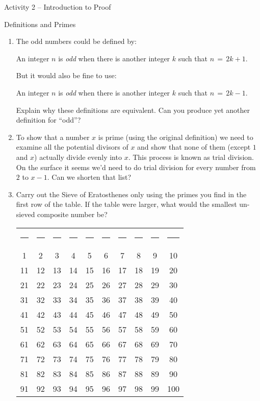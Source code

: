\documentclass{amsart}
\begin{document}
\thispagestyle{empty}

\centerline{\Large Activity 2 -- Introduction to Proof}
\centerline{\large Definitions and Primes}

\bigskip
\Large


\begin{enumerate}
\item The odd numbers could be defined by:

An integer $n$ is {\em odd} when there is another integer $k$ such that $n \, = \, 2k+1$.

But it would also be fine to use:

An integer $n$ is {\em odd} when there is another integer $k$ such that $n \, = \, 2k-1$.

Explain why these definitions are equivalent.  Can you produce yet another definition for ``odd''?

\vfill

\item To show that a number $x$ is prime (using the original definition) we need to examine all the potential divisors of $x$ and show that none of them (except $1$ and $x$) actually divide evenly into $x$.  This process is known as trial division.  On the surface it seems we'd need to do trial division for every number from $2$ to $x-1$.  Can we shorten that list?

\vfill 

\newpage

\item Carry out the Sieve of Eratosthenes only using the primes you find in the first row of the table.  If the table were larger, what would the smallest un-sieved composite number be? 

\begin{tabular}{cccccccccc}
\rule{24pt}{0pt} & \rule{24pt}{0pt} & \rule{24pt}{0pt} &
\rule{24pt}{0pt} & \rule{24pt}{0pt} & \rule{24pt}{0pt} & 
\rule{24pt}{0pt} & \rule{24pt}{0pt} & \rule{24pt}{0pt} &
\rule{24pt}{0pt} \\
\rule[-5pt]{0pt}{24pt} 1 & 2 & 3 & 4 & 5 & 6 & 7 & 8 & 9 & 10 \\
\rule[-5pt]{0pt}{24pt} 11 & 12 & 13 & 14 & 15 & 16 & 17 & 18 & 19 & 20 \\
\rule[-5pt]{0pt}{24pt} 21 & 22 & 23 & 24 & 25 & 26 & 27 & 28 & 29 & 30 \\
\rule[-5pt]{0pt}{24pt} 31 & 32 & 33 & 34 & 35 & 36 & 37 & 38 & 39 & 40 \\
\rule[-5pt]{0pt}{24pt} 41 & 42 & 43 & 44 & 45 & 46 & 47 & 48 & 49 & 50 \\
\rule[-5pt]{0pt}{24pt} 51 & 52 & 53 & 54 & 55 & 56 & 57 & 58 & 59 & 60 \\ 
\rule[-5pt]{0pt}{24pt} 61 & 62 & 63 & 64 & 65 & 66 & 67 & 68 & 69 & 70 \\
\rule[-5pt]{0pt}{24pt} 71 & 72 & 73 & 74 & 75 & 76 & 77 & 78 & 79 & 80 \\
\rule[-5pt]{0pt}{24pt} 81 & 82 & 83 & 84 & 85 & 86 & 87 & 88 & 89 & 90 \\
\rule[-5pt]{0pt}{24pt} 91 & 92 & 93 & 94 & 95 & 96 & 97 & 98 & 99 & 100
\end{tabular}


\end{enumerate}
\end{document}
